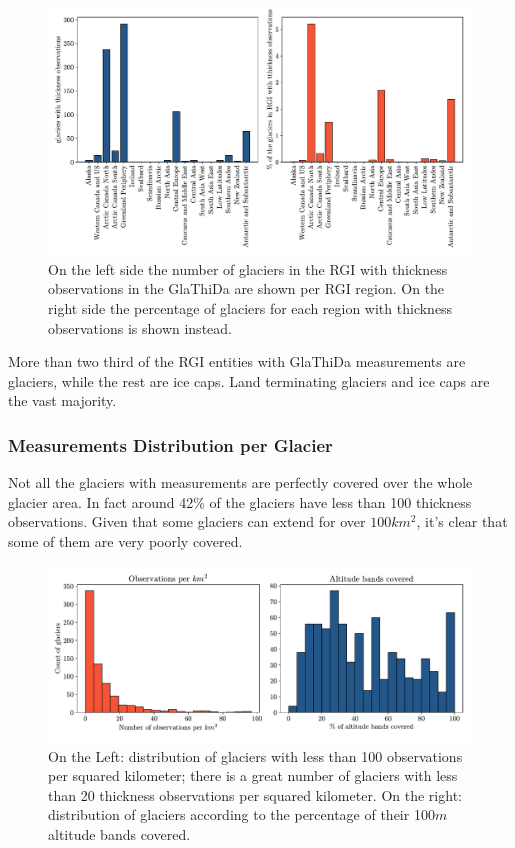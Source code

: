 \begin{figure}[!tp]
	\centering		  
	\includegraphics[width=1.\textwidth]{figures/Observations_per_region.pdf}
	\caption{On the left side the number of glaciers in the RGI with thickness observations in the GlaThiDa are shown per RGI region. On the right side the percentage of glaciers for each region with thickness observations is shown instead.}
	\label{fig:glareg}
\end{figure}

More than two third of the RGI entities with GlaThiDa measurements are glaciers, while the rest are ice caps. Land terminating glaciers and ice caps are the vast majority.

\subsubsection{Measurements Distribution per Glacier}
Not all the glaciers with measurements are perfectly covered over the whole glacier area. In fact around 42\% of the glaciers have less than 100 thickness observations. Given that some glaciers can extend for over $100 km^2$, it’s clear that some of them are very poorly covered.
\begin{figure}[!bp]
	\centering		  
	\includegraphics[width=1.\textwidth]{figures/Observations_per_skm.pdf}
	\caption{On the Left: distribution of glaciers with less than 100 observations per squared kilometer; there is a great number of glaciers with less than 20 thickness observations per squared kilometer. On the right: distribution of glaciers according to the percentage of their 100$m$ altitude bands covered.}
	\label{fig:glaobs}
\end{figure}


